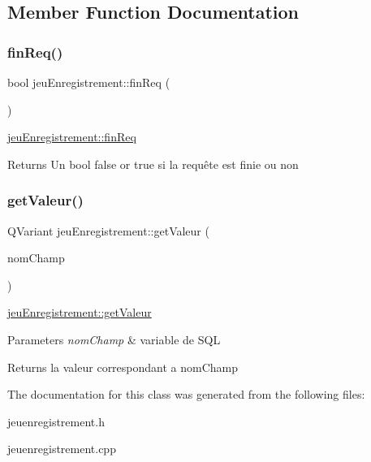 \subsection{Member Function Documentation}
\mbox{\label{classjeu_enregistrement_ad4689ab49e4a51fde86e3b00e15e473e}} 
\subsubsection{\texorpdfstring{fin\+Req()}{finReq()}}
{\footnotesize\ttfamily bool jeu\+Enregistrement\+::fin\+Req (\begin{DoxyParamCaption}{ }\end{DoxyParamCaption})}



\hyperlink{classjeu_enregistrement_ad4689ab49e4a51fde86e3b00e15e473e}{jeu\+Enregistrement\+::fin\+Req} 

\begin{DoxyReturn}{Returns}
Un bool false or true si la requête est finie ou non 
\end{DoxyReturn}
\mbox{\label{classjeu_enregistrement_acd8e0e1bc08d6b1a5c5966d565e134a2}} 
\subsubsection{\texorpdfstring{get\+Valeur()}{getValeur()}}
{\footnotesize\ttfamily Q\+Variant jeu\+Enregistrement\+::get\+Valeur (\begin{DoxyParamCaption}\item[{Q\+String}]{nom\+Champ }\end{DoxyParamCaption})}



\hyperlink{classjeu_enregistrement_acd8e0e1bc08d6b1a5c5966d565e134a2}{jeu\+Enregistrement\+::get\+Valeur} 


\begin{DoxyParams}{Parameters}
{\em nom\+Champ} & variable de S\+QL \\
\hline
\end{DoxyParams}
\begin{DoxyReturn}{Returns}
la valeur correspondant a nom\+Champ 
\end{DoxyReturn}


The documentation for this class was generated from the following files\+:\begin{DoxyCompactItemize}
\item 
jeuenregistrement.\+h\item 
jeuenregistrement.\+cpp\end{DoxyCompactItemize}
